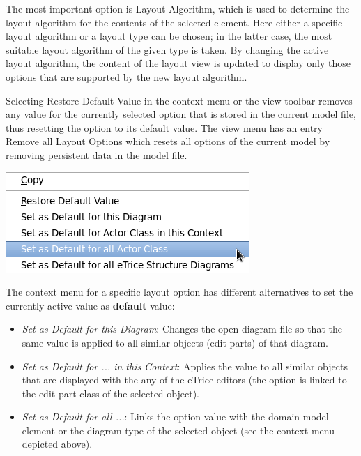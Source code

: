 The most important option is Layout Algorithm, which is used to determine the layout algorithm for the contents of the selected element. Here either a specific layout algorithm or a layout type can be chosen; in the latter case, the most suitable layout algorithm of the given type is taken. By changing the active layout algorithm, the content of the layout view is updated to display only those options that are supported by the new layout algorithm.

Selecting Restore Default Value in the context menu or the view toolbar removes any value for the currently selected option that is stored in the current model file, thus resetting the option to its default value. The view menu has an entry Remove all Layout Options which resets all options of the current model by removing persistent data in the model file.

\includegraphics[width=\linewidth]{images/043-ContextMenu.png}

The context menu for a specific layout option has different alternatives to set the currently active value as \textbf{default} value:
\begin{itemize}
\item \textit{Set as Default for this Diagram}: Changes the open diagram file so that the same value is applied to all similar objects (edit parts) of that diagram.

\item \textit{Set as Default for ... in this Context}: Applies the value to all similar objects that are displayed with the any of the eTrice editors (the option is linked to the edit part class of the selected object).

\item \textit{Set as Default for all ...}: Links the option value with the domain model element or the diagram type of the selected object (see the context menu depicted above).
\end{itemize}

